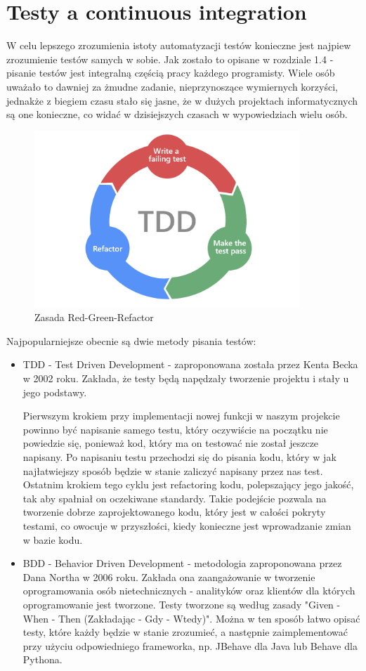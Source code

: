 \section{Testy a continuous integration}
W celu lepszego zrozumienia istoty automatyzacji testów konieczne jest najpiew zrozumienie testów samych w sobie. Jak zostało to opisane w rozdziale 1.4 - pisanie testów jest integralną częścią pracy każdego programisty. Wiele osób uważało to dawniej za żmudne zadanie, nieprzynoszące wymiernych korzyści, jednakże z biegiem czasu stało się jasne, że w dużych projektach informatycznych są one konieczne, co widać w dzisiejszych czasach w wypowiedziach wielu osób. \cite{UnitOpinions} \cite{UnitResults}
\begin{figure}[htbp]
    \centering
    \includegraphics[width=10cm]{images/tdd.png}
    \caption{Zasada Red-Green-Refactor}
    \label{fig:redgreen}
\end{figure}
\par Najpopularniejsze obecnie są dwie metody pisania testów: 
\begin{itemize}
    \item TDD - Test Driven Development - zaproponowana została przez Kenta Becka w 2002 roku. \cite{TestDrivenDevelopment} Zakłada, że testy będą napędzały tworzenie projektu i stały u jego podstawy. 
    \par Pierwszym krokiem przy implementacji nowej funkcji w naszym projekcie powinno być napisanie samego testu, który oczywiście na początku nie powiedzie się, ponieważ kod, który ma on testować nie został jeszcze napisany. Po napisaniu testu przechodzi się do pisania kodu, który w jak najłatwiejszy sposób będzie w stanie zaliczyć napisany przez nas test. Ostatnim krokiem tego cyklu jest refactoring kodu, polepszający jego jakość, tak aby spałniał on oczekiwane standardy.
    Takie podejście pozwala na tworzenie dobrze zaprojektowanego kodu, który jest w całości pokryty testami, co owocuje w przyszłości, kiedy konieczne jest wprowadzanie zmian w bazie kodu.
    
    \item BDD - Behavior Driven Development - metodologia zaproponowana przez Dana Northa w 2006 roku. Zakłada ona zaangażowanie w tworzenie oprogramowania osób nietechnicznych - analityków oraz klientów dla których oprogramowanie jest tworzone. Testy tworzone są według zasady "Given - When - Then (Zakładając - Gdy - Wtedy)". Można w ten sposób łatwo opisać testy, które każdy będzie w stanie zrozumieć, a następnie zaimplementować przy użyciu odpowiedniego frameworka, np. JBehave dla Java lub Behave dla Pythona. 
\end{itemize}

